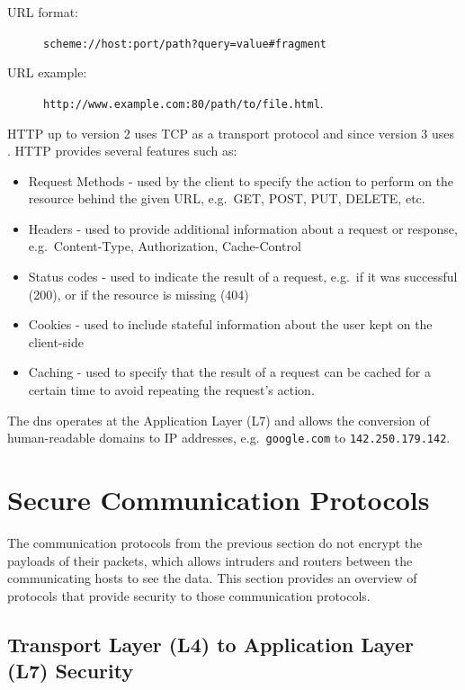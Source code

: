 \begin{description}
\item[URL format:]
\texttt{scheme://host:port/path?query=value\#fragment}
\item[URL example:]
\texttt{http://www.example.com:80/path/to/file.html}.
\end{description}

HTTP up to version 2 uses TCP as a transport protocol and since version
3 uses . HTTP provides several features such as:

\begin{itemize}
\tightlist
\item
  Request Methods - used by the client to specify the action to perform
  on the resource behind the given URL, e.g.~GET, POST, PUT, DELETE,
  etc.
\item
  Headers - used to provide additional information about a request or
  response, e.g.~Content-Type, Authorization, Cache-Control
\item
  Status codes - used to indicate the result of a request, e.g.~if it
  was successful (200), or if the resource is missing (404)
\item
  Cookies - used to include stateful information about the user kept on
  the client-side
\item
  Caching - used to specify that the result of a request can be cached
  for a certain time to avoid repeating the request's action.
\end{itemize}

The \gls{dns} operates at the Application Layer (L7) and allows the
conversion of human-readable domains to IP addresses,
e.g.~\texttt{google.com} to \texttt{142.250.179.142}.

\hypertarget{secure-communication-protocols}{%
\section{Secure Communication
Protocols}\label{secure-communication-protocols}}

The communication protocols from the previous section do not encrypt the
payloads of their packets, which allows intruders and routers between
the communicating hosts to see the data. This section provides an
overview of protocols that provide security to those communication
protocols.

\hypertarget{transport-layer-l4-to-application-layer-l7-security}{%
\subsection{Transport Layer (L4) to Application Layer (L7)
Security}\label{transport-layer-l4-to-application-layer-l7-security}}

